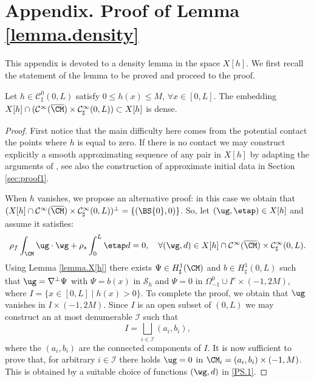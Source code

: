 \appendix
\section*{Appendix. Proof of Lemma \ref{lemma.density}}
\label{Annexe}
This appendix is devoted to a density lemma in the space $X[h]$.
We first recall the statement of the lemma to be proved and proceed
to the proof.

\begin{lemma}\label{lemma.density.app}
Let $h \in \mathcal C^0_{\sharp}(0,L)$ satisfy $0 \leq h(x) \leq M$, $\forall x\in [0, L]$. The embedding $X[h]\cap (\mathcal{C}^{\infty}(\overline{\CM}) \times \mathcal C^{\infty}_{\sharp}(0,L)) \subset X[h]$ is dense.
\end{lemma}

\begin{proof}
First notice that the main difficulty here comes from the potential contact \ie the points where $h$ is equal to zero. If there is no contact we may construct explicitly a smooth approximating sequence of any pair in $X[h]$ by adapting the arguments of \cite{Chambolle-etal}, see also the construction of approximate initial data in Section \ref{sec:proof1}.

When $h$ vanishes, we propose an alternative proof: in this case we obtain that $(X[h]\cap \mathcal{C}^{\infty}(\overline{\CM}) \times \mathcal C^{\infty}_{\sharp}(0,L))^{\perp}=\{(\BS{0},0)\}$. So, let $(\ug,\etap) \in X[h]$ and assume it satisfies:%
\begin{equation}\label{PS.1}\rho_{f}\int_{\CM}\ug\cdot\wg +\rho_{s}\int_{0}^{L}\etap d=0, \quad
\forall (\wg,d)\in X[h]\cap \mathcal{C}^{\infty}(\overline{\CM}) \times \mathcal C^{\infty}_{\sharp}(0,L).
\end{equation}
Using Lemma \ref{lemma.X[h]} there exists $\Psi\in H^{1}_{\sharp}(\CM)$ and $b\in H^{1}_{\sharp}(0,L)$ such that $\ug=\nabla^{\bot}\Psi$ with $\Psi=b(x)$ in $\mathcal{S}_{h}$ and $\Psi=0$ in $\Omega^{0}_{-1} \cup I^{c}\times(-1,2M)$, where $I=\{x\in[0,L]\mid h(x)>0\}$. To complete the proof, we obtain that $\ug$ vanishes in $I\times(-1,2M)$.
Since $I$ is an open subset of $(0,L)$ we may construct an at most denumerable $\mathcal I$ such that
\[
I=\bigsqcup_{i\in\mathcal I}(a_{i},b_{i}),
\]
where the $(a_{i},b_{i})$ are the connected components of $I$. It is now sufficient to prove that, for arbitrary $i\in \mathcal I$ there holds $\ug=0$ in $\CM_{i}=(a_{i},b_{i})\times(-1,M)$. This is obtained by a suitable choice of functions $(\wg,d)$ in \eqref{PS.1}.


\end{proof}
